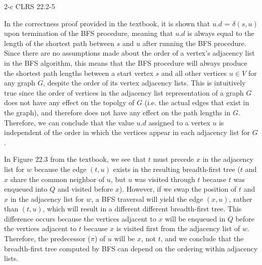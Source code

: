 \documentclass[11pt]{article}
\begin{document}
\begin{sol}
\begin{comment}
Finally, since after every traversal of the adjacency list of a vertex $v$ we are guaranteed to color the vertex black we know that any duplicate vertices that appear in $Q$ will not have any impact on the results of the BFS traversal. Furthermore, since the removal of the gray color does not change the breadth-first behavior of the traversal (because it does not modify the behavior of $Q$), we can conclude that the removal of the gray color altogether does not change the behavior of BFS; it simply poses the risk of a longer time complexity.
\end{comment}
\end{sol}

\begin{prob}{2-c}
CLRS 22.2-5 
\end{prob}
\begin{sol} 

In the correctness proof provided in the textbook, it is shown that $u.d$ = $\delta(s,u)$ upon termination of the BFS procedure, meaning that $u.d$ is always equal to the length of the shortest path between $s$ and $u$ after running the BFS procedure. Since there are no assumptions made about the order of a vertex's adjacency list in the BFS algorithm, this means that the BFS procedure will always produce the shortest path lengths between a start vertex $s$ and all other vertices $u \in V$ for any graph $G$, despite the order of its vertex adjacency lists. This is intuitively true since the order of vertices in the adjacency list representation of a graph $G$ does not have any effect on the topolgy of $G$ (i.e. the actual edges that exist in the graph), and therefore does not have any effect on the path lengths in $G$. Therefore, we can conclude that the value $u.d$ assigned to a vertex $u$ is independent of the order in which the vertices appear in each adjacency list for $G$.

In Figure 22.3 from the textbook, we see that $t$ must precede $x$ in the adjacency list for $w$ because the edge $(t,u)$ exists in the resulting breadth-first tree ($t$ and $x$ share the common neighbor of $u$, but $u$ was visited through $t$ because $t$ was enqueued into $Q$ and visited before $x$). However, if we swap the position of $t$ and $x$ in the adjacency list for $w$, a BFS traversal will yield the edge $(x,u)$, rather than $(t,u)$, which will result in a different different breadth-first tree. This difference occurs because the vertices adjacent to $x$ will be enqueued in $Q$ before the vertices adjacent to $t$ because $x$ is visited first from the adjacency list of $w$. Therefore, the predecessor ($\pi$) of $u$ will be $x$, not $t$, and we conclude that the breadth-first tree computed by BFS can depend on the ordering within adjacency lists.

\end{sol}
\end{document}
